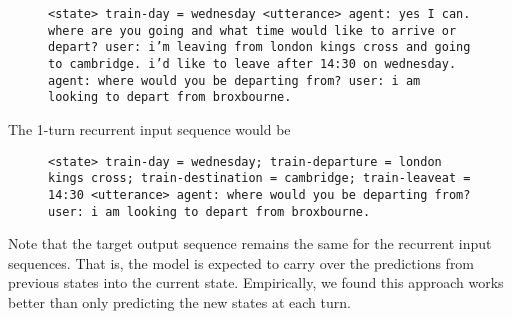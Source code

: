 \documentclass[11pt]{article}
\begin{document}
\begin{figure}[H]
\begin{small}
\texttt{<state> train-day = wednesday <utterance> agent: yes I can. where are you going and what time would like to arrive or depart? user: i'm leaving from london kings cross and going to cambridge. i'd like to leave after 14:30 on wednesday. agent: where would you be departing from? user: i am looking to depart from broxbourne.}
\end{small}
\end{figure}

The 1-turn recurrent input sequence would be
\begin{figure}[H]
\begin{small}
\texttt{<state> train-day = wednesday; train-departure = london kings cross; train-destination = cambridge; train-leaveat = 14:30 <utterance> agent: where would you be departing from? user: i am looking to depart from broxbourne.}
\end{small}
\end{figure}

Note that the target output sequence remains the same for the recurrent input sequences. That is, the model is expected to carry over the predictions from previous states into the current state. Empirically, we found this approach works better than only predicting the new states at each turn.
\end{document}
